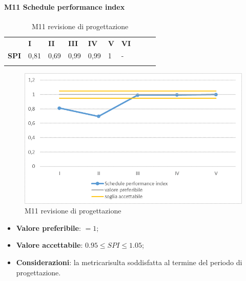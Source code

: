\paragraph{M11 Schedule performance index} \mbox{}
\begin{longtable}[H!] {						
		>{}p{50mm}  		
		>{}p{8mm}
		>{}p{8mm}		
		>{}p{8mm}		
		>{}p{8mm}		
		>{}p{8mm}		
		>{}p{8mm}
		>{}p{8mm}
		>{}p{8mm}
		>{}p{8mm}
	}
	\rowcolor{gray!50}
	\textbf{} & \textbf{I} & \textbf{II} & \textbf{III} & \textbf{IV} & \textbf{V} & \textbf{VI} \TBstrut \\ [2mm]
	\textbf{SPI} & 0,81 & 0,69 & 0,99 & 0,99 & 1 & - \TBstrut \\ [2mm]
	\rowcolor{white}
	\caption{M11 revisione di progettazione\glo}
\end{longtable}
\begin{figure}[H] 	
\includegraphics[width=\linewidth]{./img/grafici/RP8.png}	
\caption{M11 revisione di progettazione\glo}	
\end{figure}
\begin{itemize}
	\item \textbf{Valore preferibile}: $=1$;
	\item \textbf{Valore accettabile}: $0.95 \le SPI \le 1.05$;
	\item \textbf{Considerazioni}: la metrica\glosp risulta soddisfatta al termine del periodo di progettazione\glo.
\end{itemize}
